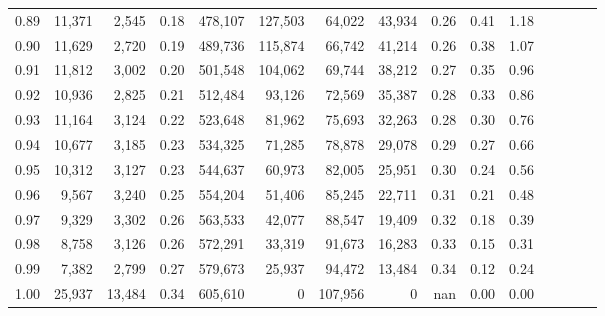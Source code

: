 \begin{tabular}{rrrcrrrrrrrrrrr}
0.89 &  11,371 &   2,545 &                                       0.18 &  478,107 &  127,503 &   64,022 &   43,934 &  0.26 &  0.41 &                         1.18 \\
0.90 &  11,629 &   2,720 &                                       0.19 &  489,736 &  115,874 &   66,742 &   41,214 &  0.26 &  0.38 &                         1.07 \\
0.91 &  11,812 &   3,002 &                                       0.20 &  501,548 &  104,062 &   69,744 &   38,212 &  0.27 &  0.35 &                         0.96 \\
0.92 &  10,936 &   2,825 &                                       0.21 &  512,484 &   93,126 &   72,569 &   35,387 &  0.28 &  0.33 &                         0.86 \\
0.93 &  11,164 &   3,124 &                                       0.22 &  523,648 &   81,962 &   75,693 &   32,263 &  0.28 &  0.30 &                         0.76 \\
0.94 &  10,677 &   3,185 &                                       0.23 &  534,325 &   71,285 &   78,878 &   29,078 &  0.29 &  0.27 &                         0.66 \\
0.95 &  10,312 &   3,127 &                                       0.23 &  544,637 &   60,973 &   82,005 &   25,951 &  0.30 &  0.24 &                         0.56 \\
0.96 &   9,567 &   3,240 &                                       0.25 &  554,204 &   51,406 &   85,245 &   22,711 &  0.31 &  0.21 &                         0.48 \\
0.97 &   9,329 &   3,302 &                                       0.26 &  563,533 &   42,077 &   88,547 &   19,409 &  0.32 &  0.18 &                         0.39 \\
0.98 &   8,758 &   3,126 &                                       0.26 &  572,291 &   33,319 &   91,673 &   16,283 &  0.33 &  0.15 &                         0.31 \\
0.99 &   7,382 &   2,799 &                                       0.27 &  579,673 &   25,937 &   94,472 &   13,484 &  0.34 &  0.12 &                         0.24 \\
1.00 &  25,937 &  13,484 &                                       0.34 &  605,610 &        0 &  107,956 &        0 &   nan &  0.00 &                         0.00 \\
\bottomrule
\end{tabular}
